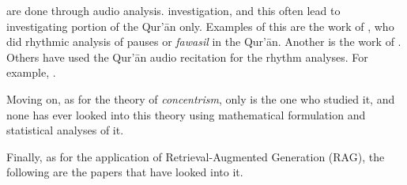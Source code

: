 are done through audio analysis. investigation, and this often lead to investigating portion of the Qur'\=an only. Examples of this are the work of , who did rhythmic analysis of pauses or \textit{fawasil} in the Qur'\=an. Another is the work of . Others have used the Qur'\=an audio recitation for the rhythm analyses. For example, .

Moving on, as for the theory of \textit{concentrism}, only  is the one who studied it, and none has ever looked into this theory using mathematical formulation and statistical analyses of it. 

Finally, as for the application of Retrieval-Augmented Generation (RAG), the following are the papers that have looked into it.